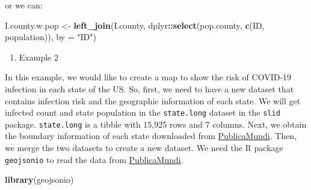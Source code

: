 \documentclass[]{book}
\newenvironment{Shaded}{\begin{snugshade}}{\end{snugshade}}
\newcommand{\KeywordTok}[1]{\textcolor[rgb]{0.13,0.29,0.53}{\textbf{#1}}}
\newcommand{\DataTypeTok}[1]{\textcolor[rgb]{0.13,0.29,0.53}{#1}}
\newcommand{\StringTok}[1]{\textcolor[rgb]{0.31,0.60,0.02}{#1}}
\newcommand{\OperatorTok}[1]{\textcolor[rgb]{0.81,0.36,0.00}{\textbf{#1}}}
\newcommand{\NormalTok}[1]{#1}
\providecommand{\tightlist}{%
  \setlength{\itemsep}{0pt}\setlength{\parskip}{0pt}}
\begin{document}
\begin{Shaded}
\end{Shaded}

or we can:

\begin{Shaded}
\begin{Highlighting}[]
\NormalTok{I.county.w.pop <-}\StringTok{ }\KeywordTok{left_join}\NormalTok{(I.county, }
\NormalTok{dplyr}\OperatorTok{::}\KeywordTok{select}\NormalTok{(pop.county, }\KeywordTok{c}\NormalTok{(ID, population)), }\DataTypeTok{by =} \StringTok{"ID"}\NormalTok{)}
\end{Highlighting}
\end{Shaded}

\begin{enumerate}
\def\labelenumi{\arabic{enumi}.}
\setcounter{enumi}{1}
\tightlist
\item
  Example 2
\end{enumerate}

In this example, we would like to create a map to show the risk of
COVID-19 infection in each state of the US. So, first, we need to have a
new dataset that contains infection risk and the geographic information
of each state. We will get infected count and state population in the
\texttt{state.long} dataset in the \texttt{slid} package.
\texttt{state.long} is a tibble with 15,925 rows and 7 columns. Next, we
obtain the boundary information of each state downloaded from
\href{https://raw.githubusercontent.com/PublicaMundi/MappingAPI/master/data/geojson/us-states.json}{PublicaMundi}.
Then, we merge the two datasets to create a new dataset. We need the R
package \texttt{geojsonio} to read the data from
\href{https://raw.githubusercontent.com/PublicaMundi/MappingAPI/master/data/geojson/us-states.json}{PublicaMundi}.

\begin{Shaded}
\begin{Highlighting}[]
\KeywordTok{library}\NormalTok{(geojsonio)}
\end{Highlighting}
\end{Shaded}
\end{document}
